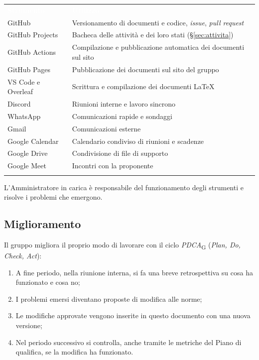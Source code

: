 \documentclass[12pt,a4paper]{article}
\newcommand{\tightlist}{\setlength{\itemsep}{1pt}\setlength{\parskip}{0pt}}
\newcommand{\gl}[1]{\emph{#1}\textsubscript{\scriptsize G}}
\newcommand{\thc}[1]{\textcolor{white}{\textbf{#1}}}
\newcommand{\rl}{\arrayrulecolor{bfline}\hline}
\begin{document}
\begin{center}
\begin{tabularx}{\linewidth}{>{\hsize=0.6\hsize\raggedright\arraybackslash}X>{\hsize=1.4\hsize\raggedright\arraybackslash}X}
\rowcolor{bfblue}\thc{Strumento} & \thc{Utilizzo} \\
GitHub & Versionamento di documenti e codice, \emph{issue}, \emph{pull request} \\ \rl
GitHub Projects & Bacheca delle attività e dei loro stati (§\ref{sec:attivita}) \\ \rl
GitHub Actions & Compilazione e pubblicazione automatica dei documenti sul sito \\ \rl
GitHub Pages & Pubblicazione dei documenti sul sito del gruppo \\ \rl
VS Code e Overleaf & Scrittura e compilazione dei documenti \LaTeX \\ \rl
Discord & Riunioni interne e lavoro sincrono \\ \rl
WhatsApp & Comunicazioni rapide e sondaggi \\ \rl
Gmail & Comunicazioni esterne \\ \rl
Google Calendar & Calendario condiviso di riunioni e scadenze \\ \rl
Google Drive & Condivisione di file di supporto \\ \rl
Google Meet & Incontri con la proponente \\ \rl
\end{tabularx}
\end{center}
L'Amministratore in carica è responsabile del funzionamento degli strumenti e risolve i problemi che emergono.

\subsection{Miglioramento}\label{sec:miglioramento}
Il gruppo migliora il proprio modo di lavorare con il ciclo \gl{PDCA} (\emph{Plan, Do, Check, Act}):
\begin{enumerate}
\tightlist
\item A fine periodo, nella riunione interna, si fa una breve retrospettiva su cosa ha funzionato e cosa no;
\item I problemi emersi diventano proposte di modifica alle norme;
\item Le modifiche approvate vengono inserite in questo documento con una nuova versione;
\item Nel periodo successivo si controlla, anche tramite le metriche del Piano di qualifica, se la modifica ha funzionato.
\end{enumerate}
\end{document}
